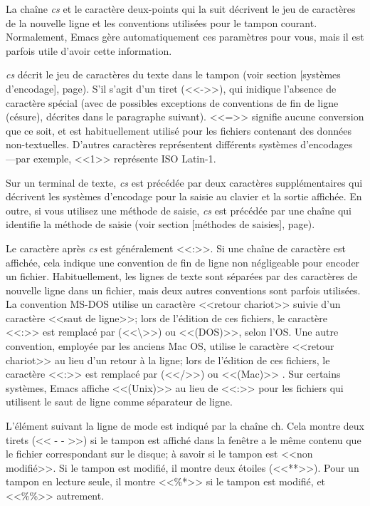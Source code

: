 La chaîne \emph{cs} et le caractère deux-points qui la suit décrivent
le jeu de caractères de la nouvelle ligne et les conventions utilisées
pour le tampon courant. Normalement, Emacs gère automatiquement ces
paramètres pour vous, mais il est parfois utile d'avoir cette
information.\par

\emph{cs} décrit le jeu de caractères du texte dans le tampon (voir
section [systèmes d'encodage],
page). S'il s'agit d'un tiret (<<->>), qui
inidique l'absence de caractère spécial (avec de possibles exceptions
de conventions de fin de ligne (césure), décrites dans le paragraphe
suivant). <<=>> signifie aucune conversion que ce soit, et est
habituellement utilisé pour les fichiers contenant des données
non-textuelles. D'autres caractères représentent différents systèmes
d'encodages  ---par exemple, <<1>> représente ISO Latin-1.\par

Sur un terminal de texte, \emph{cs} est précédée par deux caractères
supplémentaires qui décrivent les systèmes d'encodage pour la saisie
au clavier et la sortie affichée. En outre, si vous utilisez une
méthode de saisie, \emph{cs} est précédée par une chaîne qui identifie la
méthode de saisie (voir section [méthodes de
saisies], page).\par

Le caractère après \emph{cs} est généralement <<:>>. Si une chaîne de
caractère est affichée, cela indique une convention de fin de ligne
non négligeable pour encoder un fichier. Habituellement, les lignes de
texte sont séparées par des caractères de nouvelle ligne dans un
fichier, mais deux autres conventions sont parfois utilisées. La
convention MS-DOS utilise un caractère <<retour chariot>> suivie d'un
caractère <<saut de ligne>>; lors de l'édition de ces fichiers, le
caractère <<:>> est remplacé par (<<\textbackslash>>) ou <<(DOS)>>,
selon l'OS. Une autre convention, employée par les anciens Mac OS,
utilise le caractère <<retour chariot>> au lieu d'un retour à la
ligne; lors de l'édition de ces fichiers, le caractère <<:>> est
remplacé par (<</>>) ou <<(Mac)>> . Sur certains systèmes, Emacs
affiche <<(Unix)>> au lieu de <<:>> pour les fichiers qui utilisent le
saut de ligne comme séparateur de ligne.\par 

L'élément suivant la ligne de mode est indiqué par la chaîne ch. Cela
montre deux tirets (<< - - >>) si le tampon est affiché dans la fenêtre a
le même contenu que le fichier correspondant sur le disque; à savoir
si le tampon est <<non modifié>>. Si le tampon est modifié, il montre
deux étoiles (<<**>>). Pour un tampon en lecture seule, il montre
<<\%*>> si le tampon est modifié, et <<\%\%>> autrement.\par

